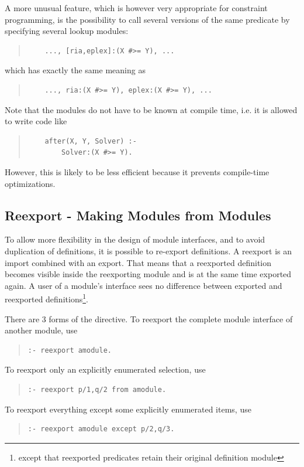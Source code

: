 A more unusual feature, which is however very appropriate for
constraint programming, is the possibility to call several versions
of the same predicate by specifying several lookup modules:
\begin{quote}\begin{verbatim}
    ..., [ria,eplex]:(X #>= Y), ...
\end{verbatim}\end{quote}
which has exactly the same meaning as
\begin{quote}\begin{verbatim}
    ..., ria:(X #>= Y), eplex:(X #>= Y), ...
\end{verbatim}\end{quote}
Note that the modules do not have to be known at compile time, i.e. it
is allowed to write code like
\begin{quote}\begin{verbatim}
    after(X, Y, Solver) :-
        Solver:(X #>= Y).
\end{verbatim}\end{quote}
However, this is likely to be less efficient because it prevents
compile-time optimizations.


\subsection{Reexport - Making Modules from Modules}

To allow more flexibility in the design of module interfaces, and to
avoid duplication of definitions, it is possible to re-export definitions.
A reexport is an import combined with an export.
That means that a reexported definition becomes visible inside the
reexporting module and is at the same time exported again.
A user of a module's interface sees no difference between
exported and reexported definitions\footnote{
    except that reexported predicates retain their original definition module}.

There are 3 forms of the
directive. To reexport the complete
module interface of another module, use
\begin{quote}\begin{verbatim}
:- reexport amodule.
\end{verbatim}\end{quote}
To reexport only an explicitly enumerated selection, use
\begin{quote}\begin{verbatim}
:- reexport p/1,q/2 from amodule.
\end{verbatim}\end{quote}
To reexport everything except some explicitly enumerated items, use
\begin{quote}\begin{verbatim}
:- reexport amodule except p/2,q/3.
\end{verbatim}\end{quote}

